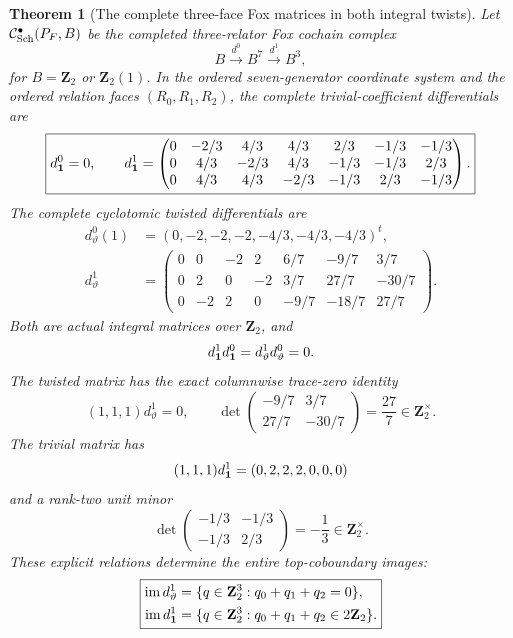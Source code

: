 \documentclass[11pt]{article}
\newtheorem{theorem}{Theorem}[section]
\theoremstyle{definition}
\begin{document}
\begin{theorem}[The complete three-face Fox matrices in both integral twists]
\label{thm:dyadic-f134-exact-two-fox-matrices}
Let
$\mathcal C_{\rm Sch}^\bullet(P_F,B)$
be the completed
three-relator
Fox cochain complex
\[
B\xrightarrow{d^0}B^7
\xrightarrow{d^1}B^3,
\]
for $B=\mathbf Z_2$
or $\mathbf Z_2(1)$.
In the ordered
seven-generator
coordinate system
and the ordered
relation faces $(R_0,R_1,R_2)$,
the \emph{complete}
trivial-coefficient
differentials are
\begin{equation}\label{eq:dyadic-f134-trivial-fox-matrix}
\boxed{
d_{\bf1}^0=0,\qquad
d_{\bf1}^1=
\begin{pmatrix}
0&-2/3&4/3&4/3&2/3&-1/3&-1/3\\
0&4/3&-2/3&4/3&-1/3&-1/3&2/3\\
0&4/3&4/3&-2/3&-1/3&2/3&-1/3
\end{pmatrix}.
}
\end{equation}
The \emph{complete}
cyclotomic twisted
differentials are
\begin{equation}\label{eq:dyadic-f134-twisted-fox-matrix}
\boxed{
\begin{aligned}
d_\vartheta^0(1)
&=(0,-2,-2,-2,-4/3,-4/3,-4/3)^t,\\
d_\vartheta^1
&=
\begin{pmatrix}
0&0&-2&2&6/7&-9/7&3/7\\
0&2&0&-2&3/7&27/7&-30/7\\
0&-2&2&0&-9/7&-18/7&27/7
\end{pmatrix}.
\end{aligned}}
\end{equation}
Both are actual
integral matrices
over $\mathbf Z_2$,
and
\[
d_{\bf1}^1d_{\bf1}^0
=d_\vartheta^1d_\vartheta^0=0.
\]
The twisted matrix has
the exact \emph{columnwise}
trace-zero identity
\begin{equation}\label{eq:dyadic-f134-cyclotomic-fox-zero-trace}
\boxed{\qquad
(1,1,1)d_\vartheta^1=0,
\qquad
\det\begin{pmatrix}
-9/7&3/7\\
27/7&-30/7
\end{pmatrix}
=\frac{27}{7}\in\mathbf Z_2^\times.
\qquad}
\end{equation}
The trivial matrix has
\[
(1,1,1)d_{\bf1}^1
=(0,2,2,2,0,0,0)
\]
and a rank-two
unit minor
\begin{equation}\label{eq:dyadic-f134-trivial-two-row-unit}
\det\begin{pmatrix}
-1/3&-1/3\\
-1/3&2/3
\end{pmatrix}
=-\frac13\in\mathbf Z_2^\times.
\end{equation}
These explicit
relations determine
the \emph{entire
top-coboundary images}:
\begin{equation}\label{eq:dyadic-f134-images-by-trace}
\boxed{
\begin{aligned}
\operatorname{im}d_\vartheta^1
&=\{q\in\mathbf Z_2^3:
q_0+q_1+q_2=0\},\\
\operatorname{im}d_{\bf1}^1
&=\{q\in\mathbf Z_2^3:
q_0+q_1+q_2\in2\mathbf Z_2\}.
\end{aligned}}
\end{equation}
\end{theorem}
\end{document}
